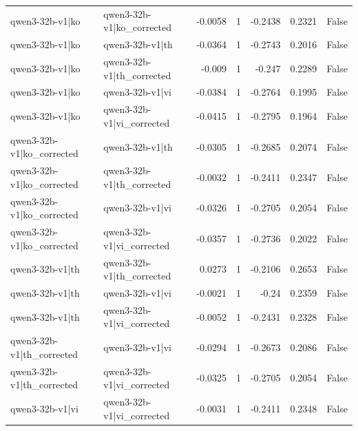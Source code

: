 \begin{table}
\begin{tabular}{l l r r r r l}
qwen3-32b-v1|ko & qwen3-32b-v1|ko_corrected & -0.0058 & 1 & -0.2438 & 0.2321 & False \\
qwen3-32b-v1|ko & qwen3-32b-v1|th & -0.0364 & 1 & -0.2743 & 0.2016 & False \\
qwen3-32b-v1|ko & qwen3-32b-v1|th_corrected & -0.009 & 1 & -0.247 & 0.2289 & False \\
qwen3-32b-v1|ko & qwen3-32b-v1|vi & -0.0384 & 1 & -0.2764 & 0.1995 & False \\
qwen3-32b-v1|ko & qwen3-32b-v1|vi_corrected & -0.0415 & 1 & -0.2795 & 0.1964 & False \\
qwen3-32b-v1|ko_corrected & qwen3-32b-v1|th & -0.0305 & 1 & -0.2685 & 0.2074 & False \\
qwen3-32b-v1|ko_corrected & qwen3-32b-v1|th_corrected & -0.0032 & 1 & -0.2411 & 0.2347 & False \\
qwen3-32b-v1|ko_corrected & qwen3-32b-v1|vi & -0.0326 & 1 & -0.2705 & 0.2054 & False \\
qwen3-32b-v1|ko_corrected & qwen3-32b-v1|vi_corrected & -0.0357 & 1 & -0.2736 & 0.2022 & False \\
qwen3-32b-v1|th & qwen3-32b-v1|th_corrected & 0.0273 & 1 & -0.2106 & 0.2653 & False \\
qwen3-32b-v1|th & qwen3-32b-v1|vi & -0.0021 & 1 & -0.24 & 0.2359 & False \\
qwen3-32b-v1|th & qwen3-32b-v1|vi_corrected & -0.0052 & 1 & -0.2431 & 0.2328 & False \\
qwen3-32b-v1|th_corrected & qwen3-32b-v1|vi & -0.0294 & 1 & -0.2673 & 0.2086 & False \\
qwen3-32b-v1|th_corrected & qwen3-32b-v1|vi_corrected & -0.0325 & 1 & -0.2705 & 0.2054 & False \\
qwen3-32b-v1|vi & qwen3-32b-v1|vi_corrected & -0.0031 & 1 & -0.2411 & 0.2348 & False \\
\bottomrule
\end{tabular}
\end{table}
